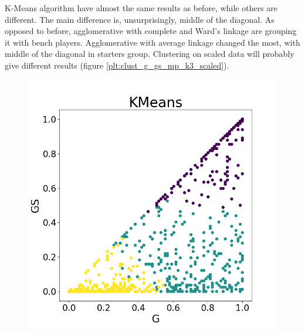 \documentclass[a4paper]{article}
\begin{document}
K-Means algorithm have almost the same results as before, while others are different. The main difference is, unsurprisingly, middle of the diagonal. As opposed to before, agglomerative with complete and Ward's linkage are grouping it with bench players. Agglomerative with average linkage changed the most, with middle of the diagonal in starters group. Clustering on scaled data will probably give different results (figure \ref{plt:clust_g_gs_mp_k3_scaled}).

\begin{figure}
\centering
\begin{minipage}{.22\textwidth}
  \centering
  \includegraphics[scale=0.14]{kmeans_g_gs_mp_scaled.png}
  \label{fig:kmeans_g_gs_mp_scaled}
\end{minipage}
\begin{minipage}{.22\textwidth}
  \centering

\end{minipage}
\end{figure}
\end{document}
